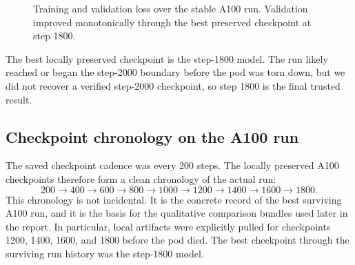 \documentclass[11pt]{article}
\begin{document}
\begin{figure}[t]
    \centering
    \caption{Training and validation loss over the stable A100 run. Validation improved monotonically through the best preserved checkpoint at step 1800.}
    \label{fig:curves}
\end{figure}

The best locally preserved checkpoint is the step-1800 model. The run likely reached or began the step-2000 boundary before the pod was torn down, but we did not recover a verified step-2000 checkpoint, so step 1800 is the final trusted result.

\subsection{Checkpoint chronology on the A100 run}
The saved checkpoint cadence was every 200 steps. The locally preserved A100 checkpoints therefore form a clean chronology of the actual run:
\[
200 \rightarrow 400 \rightarrow 600 \rightarrow 800 \rightarrow 1000 \rightarrow 1200 \rightarrow 1400 \rightarrow 1600 \rightarrow 1800.
\]
This chronology is not incidental. It is the concrete record of the best surviving A100 run, and it is the basis for the qualitative comparison bundles used later in the report. In particular, local artifacts were explicitly pulled for checkpoints 1200, 1400, 1600, and 1800 before the pod died. The best checkpoint through the surviving run history was the step-1800 model.
\end{document}
